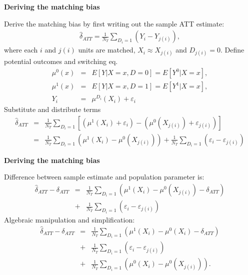 \documentclass[notes=show]{beamer}
\begin{document}
\begin{frame}[plain]
	\begin{center}
	\textbf{Deriving the matching bias}
	\end{center}
	
	 Derive the matching bias by first writing out the sample ATT estimate:
		\begin{eqnarray*}
		\widehat{\delta}_{ATT} = \frac{1}{N_T} \sum_{D_i=1} (Y_i - Y_{j(i)}),
		\end{eqnarray*}where each $i$ and $j(i)$ units are matched, $X_i \approx X_{j(i)}$ and $D_{j(i)}=0$. 
	 Define potential outcomes and switching eq.
		\begin{eqnarray*}
		\mu^0(x) &=& E[Y | X=x,D=0] = E[Y^0 | X=x],\\
		\mu^1(x) &=& E[Y | X=x,D=1] = E[Y^1 | X=x],\\
		Y_i &=& \mu^{D_i}(X_i) + \varepsilon_i
		\end{eqnarray*}
	 Substitute and distribute terms
		\begin{eqnarray*}
		\widehat{\delta}_{ATT} &=& \frac{1}{N_T} \sum_{D_i=1} \left[ (\mu^1(X_i) + \varepsilon_i) - (\mu^0(X_{j(i)}) + \varepsilon_{j(i)}) \right] \\
		&=&  \frac{1}{N_T} \sum_{D_i=1} (\mu^1(X_i) - \mu^0(X_{j(i)})) + \frac{1}{N_T} \sum_{D_i=1}(\varepsilon_i - \varepsilon_{j(i)})
		\end{eqnarray*}
\end{frame}
		

\begin{frame}[plain]
	\begin{center}
	\textbf{Deriving the matching bias}
	\end{center}
	
Difference between sample estimate and population parameter is:
		\begin{eqnarray*}
		\widehat{\delta}_{ATT} - \delta_{ATT} &=& \frac{1}{N_T} \sum_{D_i=1} \left( \mu^1(X_i) - \mu^0(X_{j(i)}) - \delta_{ATT}\right) \\
		&+& \frac{1}{N_T} \sum_{D_i=1} (\varepsilon_i - \varepsilon_{j(i)})
		\end{eqnarray*}
Algebraic manipulation and simplification:
		\begin{eqnarray*}
		\widehat{\delta}_{ATT} - \delta_{ATT} &=& \frac{1}{N_T} \sum_{D_i=1} \left( \mu^1(X_i) - \mu^0(X_i) - \delta_{ATT}\right) \\
		&+& \frac{1}{N_T} \sum_{D_i=1} (\varepsilon_i - \varepsilon_{j(i)}) \\
		&+& \frac{1}{N_T} \sum_{D_i=1} \left( \mu^0(X_i) - \mu^0(X_{j(i)}) \right).
		\end{eqnarray*}
\end{frame}
\end{document}
